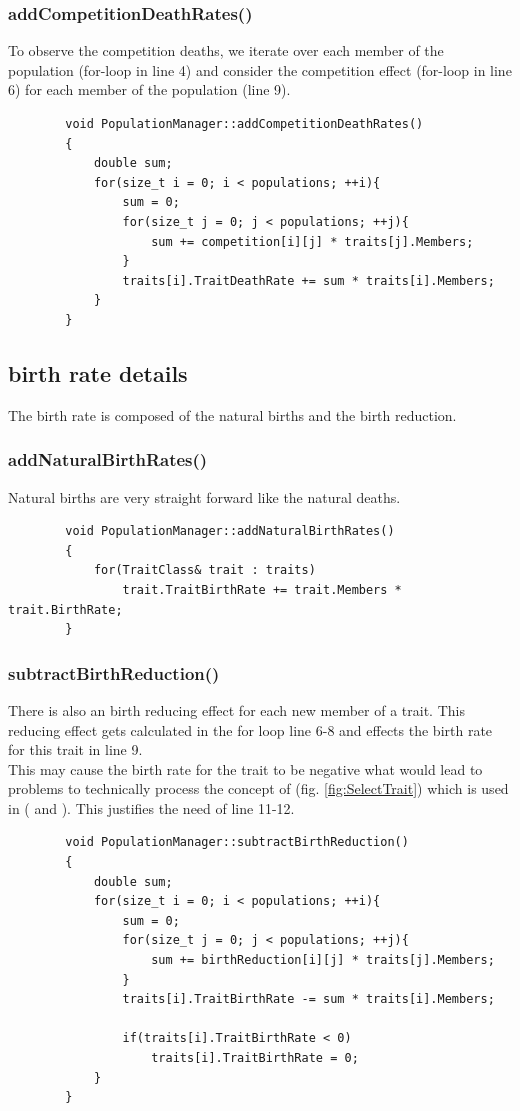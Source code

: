 \documentclass[a4paper,10pt]{scrartcl}
\begin{document}
		\subsubsection{addCompetitionDeathRates()}
		To observe the competition deaths, we iterate over each member of the population (for-loop in line 4) and consider the competition effect (for-loop in line 6) for each member of the population (line 9).
		\begin{lstlisting}
		void PopulationManager::addCompetitionDeathRates()
		{
		    double sum;
		    for(size_t i = 0; i < populations; ++i){
		        sum = 0;
		        for(size_t j = 0; j < populations; ++j){
		            sum += competition[i][j] * traits[j].Members;
		        }
		        traits[i].TraitDeathRate += sum * traits[i].Members;
		    }
		}
		\end{lstlisting}		
		
	\subsection{birth rate details}
	The birth rate is composed of the natural births and the birth reduction.
		\subsubsection{addNaturalBirthRates()}
		Natural births are very straight forward like the natural deaths.
		\begin{lstlisting}
		void PopulationManager::addNaturalBirthRates()
		{
		    for(TraitClass& trait : traits)
		        trait.TraitBirthRate += trait.Members * trait.BirthRate;
		}
		\end{lstlisting}
		
		\subsubsection{subtractBirthReduction()}
		There is also an birth reducing effect for each new member of a trait. This reducing effect gets calculated in the for loop line 6-8 and effects the birth rate for this trait in line 9.\\
		This may cause the birth rate for the trait to be negative what would lead to problems to technically process the concept of (fig. \ref{fig:SelectTrait}) which is used in ( and ). This justifies the need of line 11-12.
		\begin{lstlisting}
		void PopulationManager::subtractBirthReduction()
		{
		    double sum;
		    for(size_t i = 0; i < populations; ++i){
		        sum = 0;
		        for(size_t j = 0; j < populations; ++j){
		            sum += birthReduction[i][j] * traits[j].Members;
		        }
		        traits[i].TraitBirthRate -= sum * traits[i].Members;
		        
		        if(traits[i].TraitBirthRate < 0)
		            traits[i].TraitBirthRate = 0;
		    }
		}
		\end{lstlisting}		
		
\end{document}
